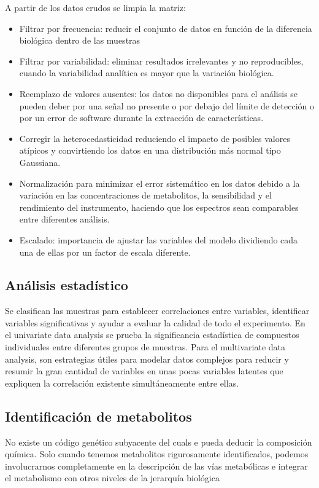 A partir de los datos crudos se limpia la matriz:
\begin{itemize}
\item Filtrar por frecuencia: reducir el conjunto de datos en función de la diferencia biológica dentro de las muestras
\item Filtrar por variabilidad: eliminar resultados irrelevantes y no reproducibles, cuando la variabilidad analítica es mayor que la variación biológica.
\item Reemplazo de valores ausentes: los datos no disponibles para el análisis se pueden deber por una señal no presente o por debajo del límite de detección o por un error de software durante la extracción de características.
\item Corregir la heterocedasticidad reduciendo el impacto de posibles valores atípicos y convirtiendo los datos en una distribución más normal tipo Gaussiana.
\item Normalización para minimizar el error sistemático en los datos debido a la variación en las concentraciones de metabolitos, la sensibilidad y el rendimiento del instrumento, haciendo que los espectros sean comparables entre diferentes análisis.
\item Escalado: importancia de ajustar las variables del modelo dividiendo cada una de ellas por un factor de escala diferente.
\end{itemize}

\subsection{Análisis estadístico}
Se clasifican las muestras para establecer correlaciones entre variables, identificar variables significativas y ayudar a evaluar la calidad de todo el experimento. En el univariate data analysis se prueba la significancia estadística de compuestos individuales entre diferentes grupos de muestras. Para el multivariate data analysis, son estrategias útiles para modelar datos complejos para reducir y resumir la gran cantidad de variables en unas pocas variables latentes que expliquen la correlación existente simultáneamente entre ellas.

\subsection{Identificación de metabolitos}
No existe un código genético subyacente del cuals e pueda deducir la composición química.
Solo cuando tenemos metabolitos rigurosamente identificados, podemos involucrarnos completamente en la descripción de las vías metabólicas e integrar el metabolismo con otros niveles de la jerarquía biológica

